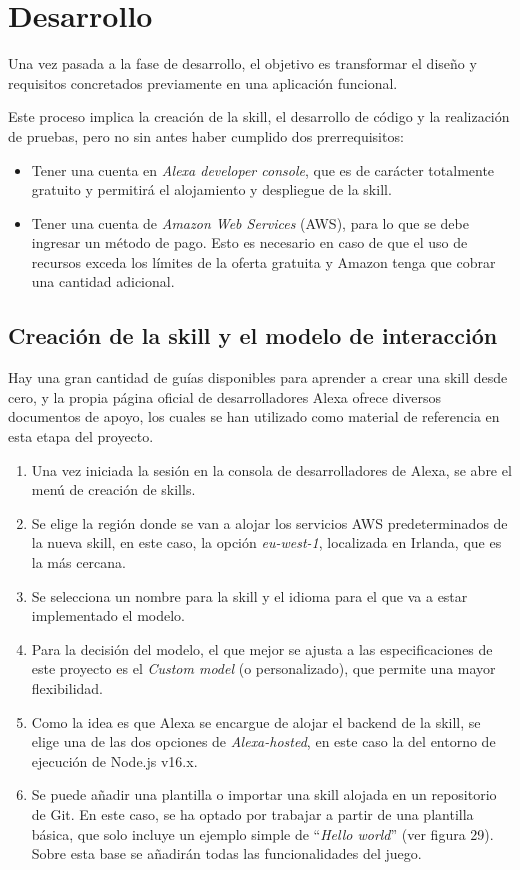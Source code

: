 \section{Desarrollo}

Una vez pasada a la fase de desarrollo, el objetivo es transformar el diseño y requisitos concretados previamente en una aplicación funcional. 

Este proceso implica la creación de la skill, el desarrollo de código y la realización de pruebas, pero no sin antes haber cumplido dos prerrequisitos:
\begin{itemize}
	\item Tener una cuenta en \textit{Alexa developer console}, que es de carácter totalmente gratuito y permitirá el alojamiento y despliegue de la skill. 
	\item Tener una cuenta de \textit{Amazon Web Services} (AWS), para lo que se debe ingresar un método de pago. Esto es necesario en caso de que el uso de recursos exceda los límites de la oferta gratuita y Amazon tenga que cobrar una cantidad adicional.
\end{itemize}

\subsection{Creación de la skill y el modelo de interacción}

Hay una gran cantidad de guías disponibles para aprender a crear una skill desde cero, y la propia página oficial de desarrolladores Alexa \parencite{alexaHosted} ofrece diversos documentos de apoyo, los cuales se han utilizado como material de referencia en esta etapa del proyecto.

\begin{enumerate}
	\item Una vez iniciada la sesión en la consola de desarrolladores de Alexa, se abre el menú de creación de skills.
	\item Se elige la región donde se van a alojar los servicios AWS predeterminados de la nueva skill, en este caso, la opción \textit{eu-west-1}, localizada en Irlanda, que es la más cercana.
	\item Se selecciona un nombre para la skill y el idioma para el que va a estar implementado el modelo.
	\item Para la decisión del modelo, el que mejor se ajusta a las especificaciones de este proyecto es el \textit{Custom model} (o personalizado), que permite una mayor flexibilidad.
	\item Como la idea es que Alexa se encargue de alojar el backend de la skill, se elige una de las dos opciones de \textit{Alexa-hosted}, en este caso la del entorno de ejecución de Node.js v16.x.
	\item Se puede añadir una plantilla o importar una skill alojada en un repositorio de Git. En este caso, se ha optado por trabajar a partir de una plantilla básica, que solo incluye un ejemplo simple de \enquote{\textit{Hello world}} (ver figura 29). Sobre esta base se añadirán todas las funcionalidades del juego.
\end{enumerate}

